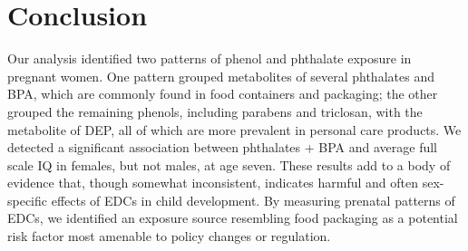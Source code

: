 \section{Conclusion}

Our analysis identified two patterns of phenol and phthalate exposure in pregnant women. One pattern grouped metabolites of several phthalates and BPA, which are commonly found in food containers and packaging; the other grouped the remaining phenols, including parabens and triclosan, with the metabolite of DEP, all of which are more prevalent in personal care products. We detected a significant association between phthalates + BPA and average full scale IQ in females, but not males, at age seven. These results add to a body of evidence that, though somewhat 
inconsistent, indicates harmful and often sex-specific effects of EDCs in child development. By measuring prenatal patterns of EDCs, we identified an exposure source resembling food packaging as a potential risk factor most amenable to policy changes or regulation.

